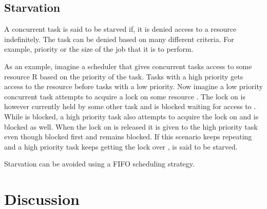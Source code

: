 \subsection{Starvation}
A concurrent task is said to be starved if, it is denied access to a resource indefinitely\cite[p. 459]{tanenbaum2008modern}. The task can be denied based on many different criteria. For example, priority or the size of the job that it is to perform.

As an example, imagine a scheduler that gives concurrent tasks access to some resource R based on the priority of the task. Tasks with a high priority gets access to the resource before tasks with a low priority. Now imagine a low priority concurrent task  attempts to acquire a lock on some resource . The lock on  is however currently held by some other task and  is blocked waiting for access to . While  is blocked, a high priority task  also attempts to acquire the lock on  and is blocked as well. When the lock on  is released it is given to the high priority task  even though  blocked first and  remains blocked. If this scenario keeps repeating and a high priority task keeps getting the lock over ,  is said to be starved.


Starvation can be avoided using a \ac{FIFO} scheduling strategy\cite[p. 459]{tanenbaum2008modern}.

\section{Discussion}
